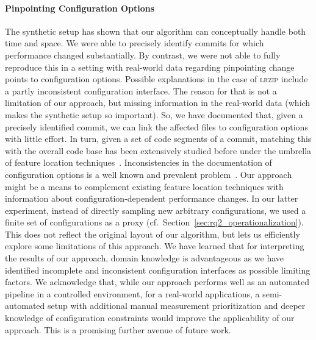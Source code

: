 \documentclass[sigconf]{acmart}
\begin{document}
	\paragraph{Pinpointing Configuration Options}
	The synthetic setup has shown that our algorithm can conceptually handle both time and space. We were able to precisely identify commits for which performance changed substantially. By contrast, we were not able to fully reproduce this in a setting with real-world data regarding pinpointing change points to configuration options. Possible explanations in the case of \textsc{lrzip} include a partly inconsistent configuration interface. 
	The reason for that is not a limitation of our approach, but missing information in the real-world data (which makes the synthetic setup so important). So, we have documented that, given a precisely identified commit, we can link the affected files to configuration options with little effort. In turn, given a set of code segments of a commit, matching this with the overall code base has been extensively studied before under the umbrella of feature location techniques~\cite{hill_which_2013}.
	Inconsistencies in the documentation of configuration options is a well known and prevalent problem~\cite{rabkin_static_2011}. Our approach might be a means to complement existing feature location techniques with information about configuration-dependent performance changes. 	
	{\color{red} In our latter experiment, instead of directly sampling new arbitrary configurations, we used a finite set of configurations as a proxy (cf.~Section~\ref{sec:rq2_operationalization}). This does not reflect the original layout of our algorithm, but lets us efficiently explore some limitations of this approach. We have learned that for interpreting the results of our approach, domain knowledge is advantageous as we have identified incomplete and inconsistent configuration interfaces as possible limiting factors. We acknowledge that, while our approach performs well as an automated pipeline in a controlled environment, for a real-world applications, a semi-automated setup with additional manual measurement prioritization and deeper knowledge of configuration constraints would improve the applicability of our approach.} This is a promising further avenue of future work.
	
\end{document}

